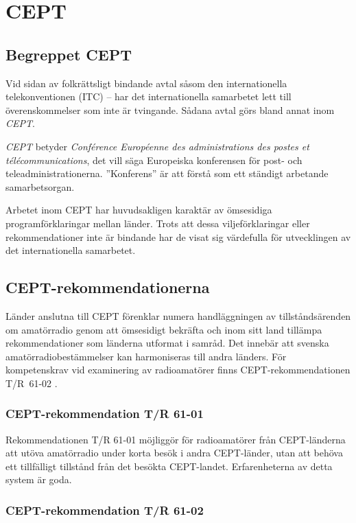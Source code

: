 \section{CEPT}
\label{CEPT}

\subsection{Begreppet CEPT}

Vid sidan av folkrättsligt bindande avtal såsom den internationella
telekonventionen (ITC) -- har det internationella samarbetet lett till
överenskommelser som inte är tvingande.
Sådana avtal görs bland annat inom \emph{CEPT}.

\emph{CEPT} betyder \emph{Conf\'erence Europ\'eenne des administrations des
postes et t\'el\'ecommunications}, det vill säga Europeiska konferensen för
post- och teleadministrationerna.
''Konferens'' är att förstå som ett ständigt arbetande samarbetsorgan.

Arbetet inom CEPT har huvudsakligen karaktär av ömsesidiga programförklaringar
mellan länder.
Trots att dessa viljeförklaringar eller rekommendationer inte är bindande har de
visat sig värdefulla för utvecklingen av det internationella samarbetet.

\subsection{CEPT-rekommendationerna}

Länder anslutna till CEPT förenklar numera handläggningen av
tillståndsärenden om amatörradio genom att ömsesidigt bekräfta och
inom sitt land tillämpa rekommendationer som länderna utformat i
samråd.
Det innebär att svenska amatörradiobestämmelser kan harmoniseras till andra
länders.
För kompetenskrav vid examinering av radioamatörer finns CEPT-rekommendationen
T/R~61-02 \cite{TR6102}.

\subsubsection{CEPT-rekommendation T/R 61-01}

Rekommendationen T/R 61-01 \cite{TR6101} möjliggör för radioamatörer från
CEPT-länderna att utöva amatörradio under korta besök i andra CEPT-länder, utan
att behöva ett tillfälligt tillstånd från det besökta CEPT-landet.
Erfarenheterna av detta system är goda.

\subsubsection{CEPT-rekommendation T/R 61-02}

